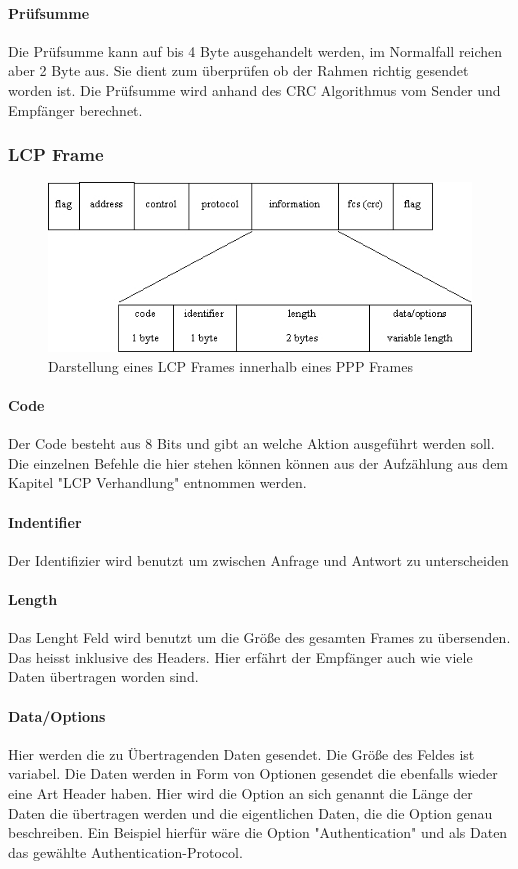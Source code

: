 \documentclass[12pt, a4paper, ngerman]{article}
\begin{document}
\paragraph{Prüfsumme}

Die Prüfsumme kann auf bis 4 Byte ausgehandelt werden, im Normalfall reichen aber 2 Byte aus. Sie dient zum überprüfen ob der Rahmen richtig gesendet worden ist. Die Prüfsumme wird anhand des CRC Algorithmus vom Sender und Empfänger berechnet. 

\subsubsection{LCP Frame}
\begin{figure}[H]
	\centering
	\includegraphics[width=1\textwidth]{Grafiken/lcp-header.jpg}	
	\caption{Darstellung eines LCP Frames innerhalb eines PPP Frames\cite{*}}
\end{figure}
\paragraph{Code}
Der Code besteht aus 8 Bits und gibt an welche Aktion ausgeführt werden soll. Die einzelnen Befehle die hier stehen können können aus der Aufzählung aus dem Kapitel "LCP Verhandlung" entnommen werden.

\paragraph{Indentifier}
Der Identifizier wird benutzt um zwischen Anfrage und Antwort zu unterscheiden

\paragraph{Length}
Das Lenght Feld wird benutzt um die Größe des gesamten Frames zu übersenden. Das heisst inklusive des Headers. Hier erfährt der Empfänger auch wie viele Daten übertragen worden sind.
\paragraph{Data/Options}
Hier werden die zu Übertragenden Daten gesendet. Die Größe des Feldes ist variabel. Die Daten werden in Form von Optionen gesendet die ebenfalls wieder eine Art Header haben. Hier wird die Option an sich genannt die Länge der Daten die übertragen werden und die eigentlichen Daten, die die Option genau beschreiben. Ein Beispiel hierfür wäre die Option "Authentication" und als Daten das gewählte Authentication-Protocol.
\end{document}
